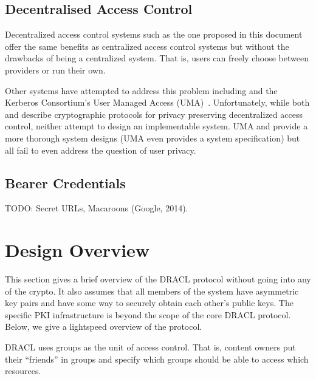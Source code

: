 \documentclass[pdftex,12pt,a4papaer]{report}
\begin{document}
\subsection{Decentralised Access Control}

Decentralized access control systems such as the one proposed in this document
offer the same benefits as centralized access control systems but without the
drawbacks of being a centralized system. That is, users can freely choose
between providers or run their own. 

Other systems have attempted to address this problem including \cite{attrib}
\cite{privattrib} \cite{drbac} \cite{socnet} and the Kerberos Consortium's User
Managed Access (UMA)~\cite{uma}. Unfortunately, while both \cite{attrib} and
\cite{privattrib} describe cryptographic protocols for privacy preserving
decentralized access control, neither attempt to design an implementable system.
UMA\cite{uma} \cite{drbac} and \cite{socnet} provide a more thorough system
designs (UMA even provides a system specification) but all fail to even address
the question of user privacy.

\subsection{Bearer Credentials}

TODO: Secret URLs, Macaroons (Google, 2014).

\section{Design Overview}

This section gives a brief overview of the DRACL protocol without going into any
of the crypto. It also assumes that all members of the system have asymmetric
key pairs and have some way to securely obtain each other's public keys. The
specific PKI infrastructure is beyond the scope of the core DRACL protocol.
Below, we give a lightspeed overview of the protocol.

DRACL uses groups as the unit of access control. That is, content owners put
their ``friends'' in groups and specify which groups should be able to access
which resources.
\end{document}

